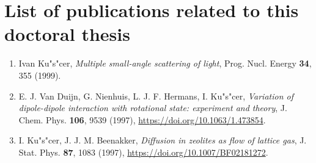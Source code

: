 \chapter*{List of publications related to this doctoral thesis}


\begin{enumerate}

\item
Ivan Ku"s"cer,
\textit{Multiple small-angle scattering of light},
Prog. Nucl. Energy
\textbf{34},
355 (1999).

\item
E. J. Van Duijn, G. Nienhuis, L. J. F. Hermans, I. Ku"s"cer,
\textit{Variation of dipole-dipole interaction with rotational state: experiment and theory},
J. Chem. Phys.
\textbf{106},
9539 (1997),
\url{https://doi.org/10.1063/1.473854}.

\item
I. Ku"s"cer, J. J. M. Beenakker,
\textit{Diffusion in zeolites as flow of lattice gas},
J. Stat. Phys.
\textbf{87},
1083 (1997),
\url{https://doi.org/10.1007/BF02181272}.

\end{enumerate}


